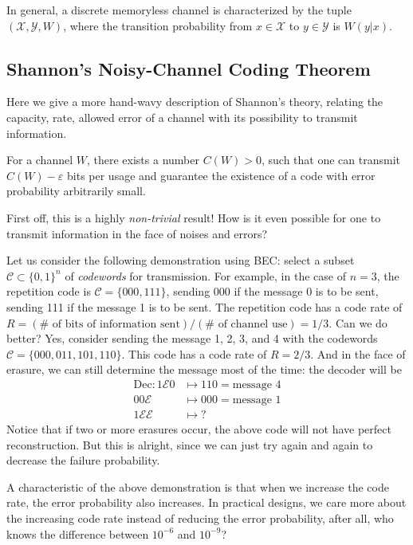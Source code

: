 In general, a discrete memoryless channel is characterized by the tuple $(\mathcal{X},\mathcal{Y},W)$, where the transition probability from $x\in\mathcal{X}$ to $y\in\mathcal{Y}$ is $W(y\vert x)$.

\subsection{Shannon's Noisy-Channel Coding Theorem}
Here we give a more hand-wavy description of Shannon's theory, relating the capacity, rate, allowed error of a channel with its possibility to transmit information.

\begin{theorem}
    For a channel $W$, there exists a number $C(W)>0$, such that one can transmit $C(W)-\varepsilon$ bits per usage and guarantee the existence of a code with error probability arbitrarily small.
\end{theorem}

First off, this is a highly \textit{non-trivial} result! How is it even possible for one to transmit information in the face of noises and errors? 

Let us consider the following demonstration using BEC: select a subset $\mathcal{C}\subset\{0,1\}^n$ of \textit{codewords} for transmission. For example, in the case of $n=3$, the repetition code is $\mathcal{C}=\{000,111\}$, sending 000 if the message 0 is to be sent, sending 111 if the message 1 is to be sent. The repetition code has a code rate of $R=(\#\text{ of bits of information sent})/(\#\text{ of channel use}) = 1/3$. Can we do better? Yes, consider sending the message 1, 2, 3, and 4 with the codewords $\mathcal{C}=\{000,011,101,110\}$. This code has a code rate of $R=2/3$. And in the face of erasure, we can still determine the message most of the time: the decoder will be
\begin{align*}
    \mathrm{Dec}: 1\mathcal{E}0 &\mapsto 110 = \text{message 4} \\
    00\mathcal{E} &\mapsto 000 = \text{message 1} \\
    1\mathcal{EE} &\mapsto ?
\end{align*}
Notice that if two or more erasures occur, the above code will not have perfect reconstruction. But this is alright, since we can just try again and again to decrease the failure probability.

A characteristic of the above demonstration is that when we increase the code rate, the error probability also increases. In practical designs, we care more about the increasing code rate instead of reducing the error probability, after all, who knows the difference between $10^{-6}$ and $10^{-9}$?

